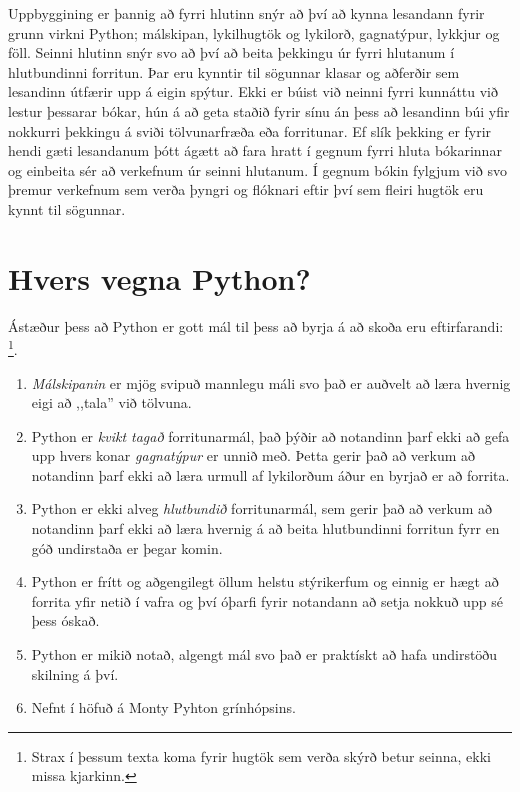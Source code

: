 Uppbyggining er þannig að fyrri hlutinn snýr að því að kynna lesandann fyrir grunn virkni Python; málskipan, lykilhugtök og lykilorð, gagnatýpur, lykkjur og föll. 
Seinni hlutinn snýr svo að því að beita þekkingu úr fyrri hlutanum í hlutbundinni forritun. 
Þar eru kynntir til sögunnar klasar og aðferðir sem lesandinn útfærir upp á eigin spýtur. 
Ekki er búist við neinni fyrri kunnáttu við lestur þessarar bókar, hún á að geta staðið fyrir sínu án þess að lesandinn búi yfir nokkurri þekkingu á sviði tölvunarfræða eða forritunar. 
Ef slík þekking er fyrir hendi gæti lesandanum þótt ágætt að fara hratt í gegnum fyrri hluta bókarinnar og einbeita sér að verkefnum úr seinni hlutanum. 
Í gegnum bókin fylgjum við svo þremur verkefnum sem verða þyngri og flóknari eftir því sem fleiri hugtök eru kynnt til sögunnar. 

\section{Hvers vegna Python?}

Ástæður þess að Python er gott mál til þess að byrja á að skoða eru eftirfarandi: \footnote{Strax í þessum texta koma fyrir hugtök sem verða skýrð betur seinna, ekki missa kjarkinn.}.

\begin{enumerate}
	\item \textit{Málskipanin} er mjög svipuð mannlegu máli svo það er auðvelt að læra hvernig eigi að ,,tala'' við tölvuna.
	\item  Python er \textit{kvikt tagað} forritunarmál, það þýðir að notandinn þarf ekki að gefa upp hvers konar \textit{gagnatýpur} er unnið með. 
	Þetta gerir það að verkum að notandinn þarf ekki að læra urmull af lykilorðum áður en byrjað er að forrita.
	\item  Python er ekki alveg \textit{hlutbundið} forritunarmál, sem gerir það að verkum að notandinn þarf ekki að læra hvernig á að beita hlutbundinni forritun fyrr en góð undirstaða er þegar komin.
	\item Python er frítt og aðgengilegt öllum helstu stýrikerfum og einnig er hægt að forrita yfir netið í vafra og því óþarfi fyrir notandann að setja nokkuð upp sé þess óskað.
	\item Python er mikið notað, algengt mál svo það er praktískt að hafa undirstöðu skilning á því.
	\item Nefnt í höfuð á Monty Pyhton grínhópsins.
\end{enumerate}

